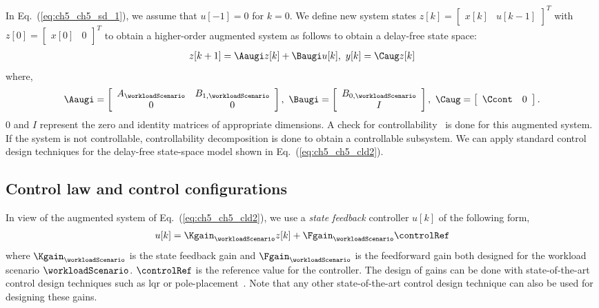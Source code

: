 In Eq.~(\ref{eq:ch5_ch5_sd_1}), we assume that $u[-1]=0$ for $k=0$. We define new system states $z[k]=\left[ \begin{array}{cc} x[k] &  u[k-1] \end{array} \right]^T$ with $z[0]=\left[ \begin{array}{cc} x[0] &  0 \end{array} \right]^T$ to obtain a higher-order augmented system as follows to obtain a delay-free state space:
\begin{align}
\label{eq:ch5_ch5_cld2}
z[k+1]= \Aaugi z[k] + \Baugi u[k],\ y[k]= \Caug z[k] \vspace{-2mm}
\end{align}
where,
\begin{eqnarray}
\Aaugi  = \left[ \begin{array}{cc} A_{\workloadScenario} &  B_{1,\workloadScenario} \\  0 & 0 \end{array} \right],\ 
\Baugi = \left[ \begin{array}{c} B_{0,\workloadScenario} \\  I \end{array} \right],\ 
\Caug = \left[ \begin{array}{cc} \Ccont &  0 \end{array} \right].
\label{eq:ch5_ch5_aug}
\nonumber
\end{eqnarray}
$0$ and $I$ represent the zero and identity matrices of appropriate dimensions. A check for controllability~\cite{dorf2011modern} is done for this augmented system.
If the system is not controllable, controllability decomposition is done to obtain a controllable subsystem. We can apply standard control design techniques for the delay-free state-space model shown in Eq.~(\ref{eq:ch5_ch5_cld2}). 
 
\subsection{Control law and control configurations}
\label{sec:ch5_ch5_control law}
In view of the augmented system of  Eq.~(\ref{eq:ch5_ch5_cld2}), we use a \emph{state feedback} controller $u[k]$ of the following form,
 \begin{align}
		u[k] = \Kgain_{\workloadScenario} z[k] + \Fgain_{\workloadScenario} \controlRef
        \nonumber
 \end{align}
where $\Kgain_{\workloadScenario}$ is the state feedback gain and $\Fgain_{\workloadScenario}$ is the feedforward gain both designed for the workload scenario $\workloadScenario$. $\controlRef$ is the reference value for the controller. The design of gains can be done with state-of-the-art control design techniques such as \gls{lqr} or pole-placement~\cite{dorf2011modern}. 
Note that any other state-of-the-art control design technique can also be used for designing these gains.

